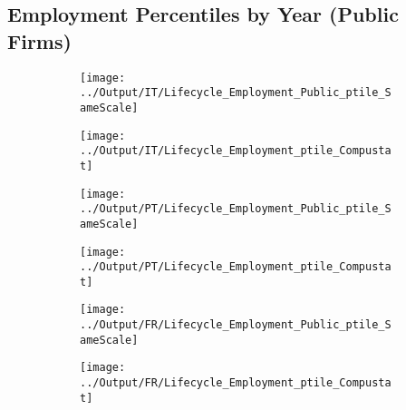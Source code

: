 \documentclass[12pt,notitlepage]{article}
\begin{document}
\subsection{Employment Percentiles by Year (Public Firms)}

\begin{figure}[!htpb]
\centering
\begin{subfigure}{.49\textwidth}
    \centering
 \texttt{[image: ../Output/IT/Lifecycle\_Employment\_Public\_ptile\_SameScale]}
\end{subfigure}%
\begin{subfigure}{.49\textwidth}
    \centering
 \texttt{[image: ../Output/IT/Lifecycle\_Employment\_ptile\_Compustat]}
\end{subfigure}
\begin{subfigure}{.49\textwidth}
    \centering
 \texttt{[image: ../Output/PT/Lifecycle\_Employment\_Public\_ptile\_SameScale]}
\end{subfigure}%
\begin{subfigure}{.49\textwidth}
    \centering
 \texttt{[image: ../Output/PT/Lifecycle\_Employment\_ptile\_Compustat]}
\end{subfigure}
\begin{subfigure}{.49\textwidth}
    \centering
 \texttt{[image: ../Output/FR/Lifecycle\_Employment\_Public\_ptile\_SameScale]}
\end{subfigure}%
\begin{subfigure}{.49\textwidth}
    \centering
 \texttt{[image: ../Output/FR/Lifecycle\_Employment\_ptile\_Compustat]}
\end{subfigure}
\end{figure}
\pagebreak
\end{document}
